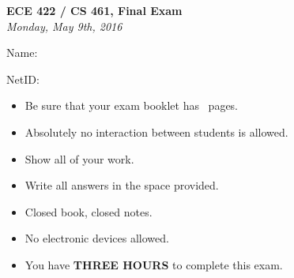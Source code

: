 \documentclass[addpoints]{exam}
\begin{document}
\begin{titlepage}
  \vspace*{\fill}
  \begin{center}
    \Large\textbf{ECE 422 / CS 461, Final Exam}\\
    \large\textit{Monday, May 9th, 2016}\\
  \end{center}
  \vspace{.5in}
  \par\large{Name:}\hrulefill\\
  \par\large{NetID:}\hrulefill\\
  \vspace{.5in}
  \begin{itemize}
  \item Be sure that your exam booklet has \numpages\ pages.
  \item Absolutely no interaction between students is allowed.
  \item Show all of your work.
  \item Write all answers in the space provided.
  \item Closed book, closed notes.
  \item No electronic devices allowed.
  \item You have \textbf{THREE HOURS} to complete this exam.
  \end{itemize}
  \vspace*{\fill}
\end{titlepage}
\newpage 

\begin{center}
  \gradetable[v][pages]
\end{center}
\newpage
\end{document}
